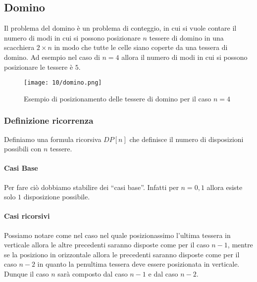     \subsection{Domino}
        Il problema del domino è un problema di conteggio, in cui si vuole contare il numero di modi in cui si possono posizionare $n$ tessere di domino in una scacchiera $2 \times n$ in modo che tutte le celle siano coperte da una tessera di domino. Ad esempio nel caso di $n=4$ allora il numero di modi in cui si possono posizionare le tessere è $5$.
        \begin{figure}[H]
            \centering
            \texttt{[image: 10/domino.png]}
            \caption{Esempio di posizionamento delle tessere di domino per il caso $n=4$}
        \end{figure}
        \subsubsection{Definizione ricorrenza}
            Definiamo una formula ricorsiva $DP[n]$ che definisce il numero di disposizioni possibili con $n$ tessere.
            \paragraph{Casi Base} Per fare ciò dobbiamo stabilire dei ``casi base''. Infatti per $n=0,1$ allora esiste solo $1$ disposizione possibile.
            \paragraph{Casi ricorsivi} Possiamo notare come nel caso nel quale posizionassimo l'ultima tessera in verticale allora le altre precedenti saranno disposte come per il caso $n-1$, mentre se la posiziono in orizzontale allora le precedenti saranno disposte come per il caso $n-2$ in quanto la penultima tessera deve essere posizionata in verticale. Dunque il caso $n$ sarà composto dal caso $n-1$ e dal caso $n-2$.
